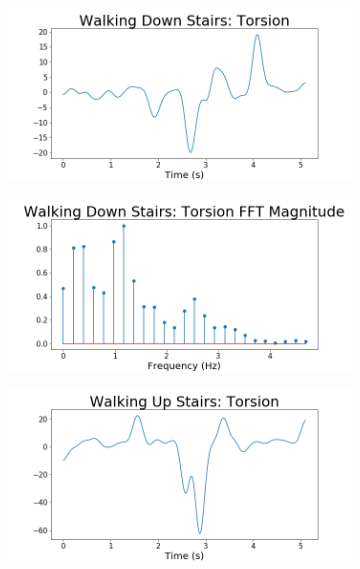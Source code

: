 \begin{figure}[ht]
\begin{subfigure}{.5\textwidth}
  \includegraphics[width = \textwidth]{images/smooth/Walking Down Stairs torsion_ma.png}
    \caption{}
    \label{fig:walkdown_tor}
\end{subfigure}
\begin{subfigure}{.5\textwidth}
    \includegraphics[width = \textwidth]{images/smooth/Walking Down Stairs torsionFFT_ma.png}
    \caption{}
    \label{fig:walkdown_tor_fft}
\end{subfigure}
\begin{subfigure}{.5\textwidth}
  \includegraphics[width = \textwidth]{images/smooth/Walking Up Stairs torsion_ma.png}

\end{subfigure}
\end{figure}
